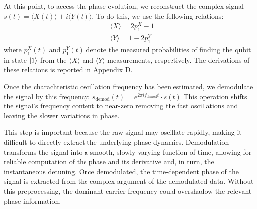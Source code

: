 At this point, to access the phase evolution, we reconstruct the complex signal $s(t) = \langle X(t) \rangle + i\langle Y(t) \rangle$. 
To do this, we use the following relations:
\begin{align}
    & \langle X \rangle = 2p^X_1 - 1 \\
    & \langle Y \rangle = 1 - 2p^Y_1
\end{align}
where $p^X_1(t)$ and $p^Y_1(t)$ denote the measured probabilities of finding the qubit in state $\ket{1}$ from the $\langle X \rangle$ and $\langle Y \rangle$ measurements, respectively.
The derivations of these relations is reported in \hyperref[app:AppendixD]{Appendix D}.

Once the charachteristic oscillation frequency has been estimated, we demodulate the signal by this frequency: $s_{\text{demod}}(t) = e^{2\pi i f_{\text{demod}} t} \cdot s(t)$
This operation shifts the signal's frequency content to near-zero removing the fast oscillations and leaving the slower variations in phase.

This step is important because the raw signal may oscillate rapidly, making it difficult to directly extract the underlying phase dynamics. 
Demodulation transforms the signal into a smooth, slowly varying function of time, allowing for reliable computation of the phase and its derivative and, in turn, the instantaneous detuning.
Once demodulated, the time-dependent phase of the signal is extracted from the complex argument of the demodulated data. 
Without this preprocessing, the dominant carrier frequency could overshadow the relevant phase information.

